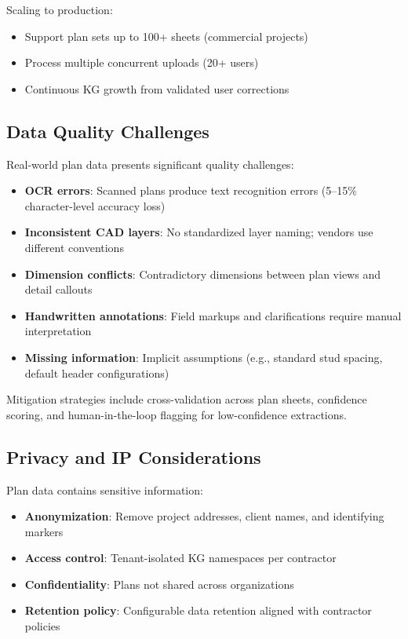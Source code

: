 Scaling to production:
\begin{itemize}
  \item Support plan sets up to 100+ sheets (commercial projects)
  \item Process multiple concurrent uploads (20+ users)
  \item Continuous KG growth from validated user corrections
\end{itemize}

\subsection{Data Quality Challenges}

Real-world plan data presents significant quality challenges:
\begin{itemize}
  \item \textbf{OCR errors}: Scanned plans produce text recognition errors (5--15\% character-level accuracy loss)
  \item \textbf{Inconsistent CAD layers}: No standardized layer naming; vendors use different conventions
  \item \textbf{Dimension conflicts}: Contradictory dimensions between plan views and detail callouts
  \item \textbf{Handwritten annotations}: Field markups and clarifications require manual interpretation
  \item \textbf{Missing information}: Implicit assumptions (e.g., standard stud spacing, default header configurations)
\end{itemize}

Mitigation strategies include cross-validation across plan sheets, confidence scoring, and human-in-the-loop flagging for low-confidence extractions.

\subsection{Privacy and IP Considerations}

Plan data contains sensitive information:
\begin{itemize}
  \item \textbf{Anonymization}: Remove project addresses, client names, and identifying markers
  \item \textbf{Access control}: Tenant-isolated KG namespaces per contractor
  \item \textbf{Confidentiality}: Plans not shared across organizations
  \item \textbf{Retention policy}: Configurable data retention aligned with contractor policies
\end{itemize}

